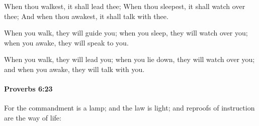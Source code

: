 			\begin{versebox}
					\item[BHS] 
					\item[ASV] When thou walkest, it shall lead thee; When thou sleepest, it shall watch over thee; And when thou awakest, it shall talk with thee.
					\item[NIV] When you walk, they will guide you; when you sleep, they will watch over you; when you awake, they will speak to you.
					\item[NRSV] When you walk, they will lead you; when you lie down, they will watch over you; and when you awake, they will talk with you.
			\end{versebox}

		\paragraph{Proverbs 6:23} %
			\label{PROVERBS-6-23}

			For the commandment is a lamp; and the law is light; and reproofs of instruction are the way of life:

